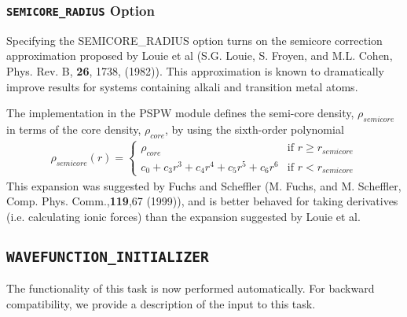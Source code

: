 \subsubsection{{\tt SEMICORE\_RADIUS} Option}
Specifying the SEMICORE\_RADIUS option turns on the semicore correction approximation proposed
by Louie et al (S.G. Louie, S. Froyen, and M.L. Cohen, Phys. Rev. B, \textbf{26}, 1738, (1982)).  
This approximation is known to dramatically improve results for systems containing 
alkali and transition metal atoms.  

The implementation in the PSPW module defines the semi-core density, $\rho_{semicore}$ in terms of 
the core density, $\rho_{core}$, by using the sixth-order polynomial
\begin{eqnarray}
\rho_{semicore}(r) = \left\{ \begin{array}{ll}
                              \rho_{core} & \mbox{if $r \geq r_{semicore}$} \\
                              c_0 + c_3 r^3 + c_4 r^4 + c_5 r^5 + c_6 r^6 &  \mbox{if $r < r_{semicore}$}
                            \end{array}
                     \right.
\end{eqnarray}
This expansion was suggested by Fuchs and Scheffler 
(M. Fuchs, and M. Scheffler, Comp. Phys. Comm.,\textbf{119},67 (1999)), 
and is better behaved for taking derivatives (i.e. calculating ionic forces) than the expansion suggested 
by Louie et al.




\subsection{\tt WAVEFUNCTION\_INITIALIZER}
\label{sec:pspw_wavefunction_initializer}
The functionality of this task is now performed automatically. For backward 
compatibility, we provide a description of the input to this task.


